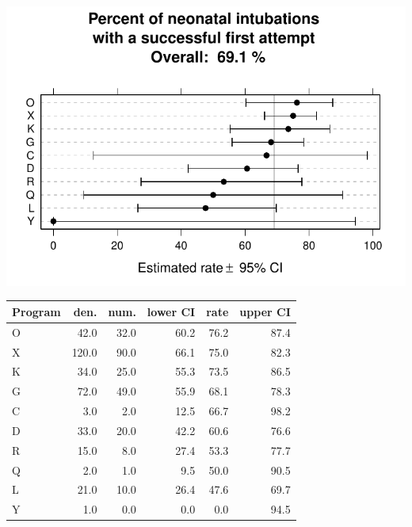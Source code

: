 \documentclass[twoside]{article}\usepackage[]{graphicx}\usepackage[]{color}
\makeatletter
\def\maxwidth{ %
  \ifdim\Gin@nat@width>\linewidth
    \linewidth
  \else
    \Gin@nat@width
  \fi
}
\newenvironment{knitrout}{}{} %
\makeatother
\begin{document}
\begin{center}
\begin{knitrout}
\color{fgcolor}
\includegraphics[width=\maxwidth]{figure/r_neonatal_intubation_success} 

\end{knitrout}

\end{center}

\begin{table}[ht]
\centering
\begin{tabular}{lrrrrr}
  \hline
Program & den. & num. & lower CI & rate & upper CI \\ 
  \hline
O & 42.0 & 32.0 & 60.2 & 76.2 & 87.4 \\ 
  X & 120.0 & 90.0 & 66.1 & 75.0 & 82.3 \\ 
  K & 34.0 & 25.0 & 55.3 & 73.5 & 86.5 \\ 
  G & 72.0 & 49.0 & 55.9 & 68.1 & 78.3 \\ 
  C & 3.0 & 2.0 & 12.5 & 66.7 & 98.2 \\ 
  D & 33.0 & 20.0 & 42.2 & 60.6 & 76.6 \\ 
  R & 15.0 & 8.0 & 27.4 & 53.3 & 77.7 \\ 
  Q & 2.0 & 1.0 & 9.5 & 50.0 & 90.5 \\ 
  L & 21.0 & 10.0 & 26.4 & 47.6 & 69.7 \\ 
  Y & 1.0 & 0.0 & 0.0 & 0.0 & 94.5 \\ 
   \hline
\end{tabular}
\end{table}
\end{document}

